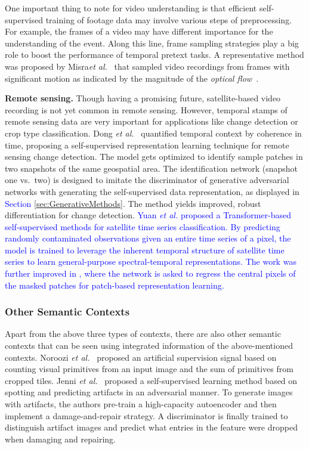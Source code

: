 \documentclass[lettersize,journal]{IEEEtran}
\newcommand{\etal}{\textit{et al.}}
\begin{document}
One important thing to note for video understanding is that efficient self-supervised training of footage data may involve various steps of preprocessing. For example, the frames of a video may have different importance for the understanding of the event. Along this line, frame sampling strategies play a big role to boost the performance of temporal pretext tasks. A representative method was proposed by Misra\etal~\cite{misra2016shuffle} that sampled video recordings from frames with significant motion as indicated by the magnitude of the \textit{optical flow}~\cite{fortun2015optical}.
 
\textbf{Remote sensing.} Though having a promising future, satellite-based video recording is not yet common in remote sensing. However, temporal stamps of remote sensing data are very important for applications like change detection or crop type classification. Dong \etal~\cite{dong2020self} quantified temporal context by coherence in time, proposing a self-supervised representation learning technique for remote sensing change detection. The model gets optimized to identify sample patches in two snapshots of the same geospatial area. The identification network (snapshot one vs.\ two) is designed to imitate the discriminator  of generative adversarial networks with  generating the self-supervised data representation, as displayed in \textcolor{blue}{Section} \ref{sec:GenerativeMethods}. The method yields improved, robust differentiation for change detection. \textcolor{blue}{Yuan \etal \cite{yuan2020self} proposed a Transformer-based self-supervised methods for satellite time series classification. By predicting randomly contaminated observations given an entire time series of a pixel, the model is trained to leverage the inherent temporal structure of satellite time series to learn general-purpose spectral-temporal representations. The work was further improved in \cite{yuan2022sits}, where the network is asked to regress the central pixels of the masked patches for patch-based representation learning.}



\subsubsection{Other Semantic Contexts}

Apart from the above three types of contexts, there are also other semantic contexts that can be seen using integrated information of the above-mentioned contexts. Noroozi \etal~\cite{noroozi2017representation} proposed an artificial supervision signal based on counting visual primitives from an input image and the sum of primitives from cropped tiles. Jenni \etal~\cite{jenni2018self} proposed a self-supervised learning method based on spotting and predicting artifacts in an adversarial manner. To generate images with artifacts, the authors pre-train a high-capacity autoencoder and then implement a damage-and-repair strategy. A discriminator is finally trained to distinguish artifact images and predict what entries in the feature were dropped when damaging and repairing.
\end{document}
